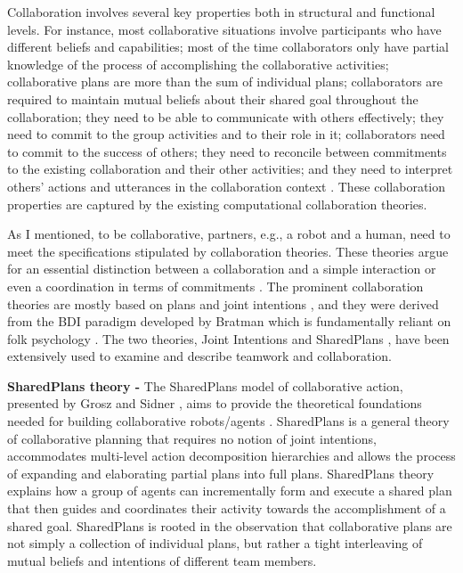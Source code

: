 \documentclass[a4paper, 10pt]{article}
\begin{document}
\begin{small}
Collaboration involves several key properties both in structural and functional
levels. For instance, most collaborative situations involve participants who
have different beliefs and capabilities; most of the time collaborators only
have partial knowledge of the process of accomplishing the collaborative
activities; collaborative plans are more than the sum of individual plans;
collaborators are required to maintain mutual beliefs about their shared goal
throughout the collaboration; they need to be able to communicate with others
effectively; they need to commit to the group activities and to their role in
it; collaborators need to commit to the success of others; they need to
reconcile between commitments to the existing collaboration and their other
activities; and they need to interpret others' actions and utterances in the
collaboration context \cite{grosz:mice-menus}. These collaboration properties
are captured by the existing computational collaboration theories.

As I mentioned, to be collaborative, partners, e.g., a robot and a human, need
to meet the specifications stipulated by collaboration theories. These theories
argue for an essential distinction between a collaboration and a simple
interaction or even a coordination in terms of commitments
\cite{grosz:shared-plans, lochbaum:collaborative-planning}. The prominent
collaboration theories are mostly based on plans and joint intentions
\cite{cohen:teamwork,grosz:plans-discourse,Litman:discourse-commonsense}, and
they were derived from the BDI paradigm developed by Bratman
\cite{bratman:intentions-plans} which is fundamentally reliant on folk
psychology \cite{ravenscroft:folk}. The two theories, Joint Intentions
\cite{cohen:teamwork} and SharedPlans \cite{grosz:plans-discourse}, have been
extensively used to examine and describe teamwork and collaboration.

\textbf{SharedPlans theory -} The SharedPlans model of collaborative
action, presented by Grosz and Sidner \cite{grosz:planning-acting,
grosz:collaboration, grosz:plans-discourse}, aims to provide the theoretical
foundations needed for building collaborative robots/agents
\cite{grosz:collaborative-systems}. SharedPlans is a general theory of
collaborative planning that requires no notion of joint intentions, accommodates
multi-level action decomposition hierarchies and allows the process of expanding
and elaborating partial plans into full plans. SharedPlans theory explains how a
group of agents can incrementally form and execute a shared plan that then
guides and coordinates their activity towards the accomplishment of a shared
goal. SharedPlans is rooted in the observation that collaborative plans are not
simply a collection of individual plans, but rather a tight interleaving of
mutual beliefs and intentions of different team members.


\end{small}
\end{document}
